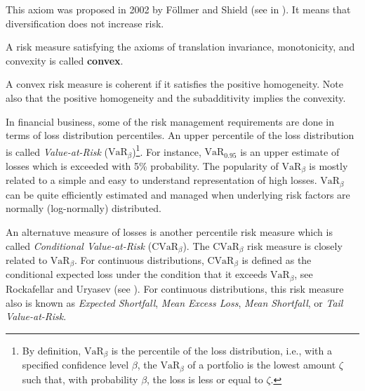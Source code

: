 This axiom  was proposed in 2002 by Föllmer and Shield (see in \cite{Follmer2002}). It means that diversification does not increase risk.

\begin{definition}
	A risk measure satisfying the axioms of translation invariance, monotonicity, and convexity is called \textbf{convex}.
\end{definition}

\begin{proposition}
	A convex risk measure is coherent if it satisfies the positive homogeneity. Note also that the positive homogeneity and the subadditivity implies the convexity.
\end{proposition}


In financial business, some of the risk management requirements are done in terms of loss distribution percentiles. An upper percentile of the loss distribution is called \textit{Value-at-Risk} ($\mbox{VaR}_\beta$)\footnote{By definition, $\mbox{VaR}_\beta$ is the percentile of the loss distribution, i.e., with a specified confidence level $\beta$, the $\mbox{VaR}_\beta$ of a portfolio is the lowest amount $\zeta$ such that, with probability $\beta$, the loss is less or equal to $\zeta$.}. For instance, $\mbox{VaR}_{0.95}$ is an upper estimate of losses which is exceeded with 5\% probability. The popularity of $\mbox{VaR}_\beta$ is mostly related to a simple and easy to understand representation of high losses. $\mbox{VaR}_\beta$ can be quite efficiently estimated and managed when underlying risk factors are normally (log-normally) distributed.

An alternatuve measure of losses is another percentile risk measure which is called \textit{Conditional Value-at-Risk} ($\mbox{CVaR}_\beta$). The $\mbox{CVaR}_\beta$ risk measure is closely related to $\mbox{VaR}_\beta$. For continuous distributions, $\mbox{CVaR}_\beta$ is defined as the conditional expected loss under the condition that it exceeds $\mbox{VaR}_\beta$, see Rockafellar and Uryasev (see \cite{RockafellarUryasev2001}). For continuous distributions, this risk measure also is known as \emph{Expected Shortfall}, \textit{Mean Excess Loss}, \textit{Mean Shortfall}, or \textit{Tail Value-at-Risk}.


